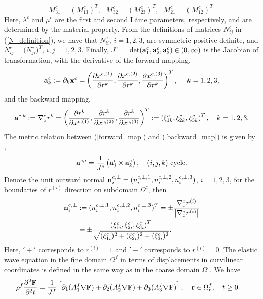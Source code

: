 \[ M_{31}^c = (M_{13}^c)^T, \ \ \  M_{32}^c =(M_{23}^c)^T, \ \ \ M_{21}^c =(M_{12}^c)^T.\]
Here, $\lambda^c$ and $\mu^c$ are the first and second L{\' {a}}me parameters, respectively, and are determined by the material property. From the definitions of matrices $N_{ij}^c$ in (\ref{N_definition}), we have that $N_{ii}^c$, $i = 1,2,3$, are symmetric positive definite, and $N_{ij}^c=\big(N_{ji}^c\big)^T$, $i,j=1,2,3$. Finally, $J^c =$ det$\left({\bf a}^c_1,{\bf a}^c_2,{\bf a}^c_3\right)\in (0,\infty)$ is the Jacobian of transformation, with the derivative of the forward mapping, 
\begin{equation}\label{forward_map}
{\bf a}_k^c := \partial_k{\bf x}^c  = \left(\frac{\partial x^{c,(1)}}{\partial r^{k}},\frac{\partial x^{c,(2)}}{\partial r^{k}},\frac{\partial x^{c,(3)}}{\partial r^{k}}\right)^T,\ \ \ \ k = 1,2,3,
\end{equation}
and the backward mapping,
\begin{equation}\label{backward_map}
{\bf a}^{c,k} := \nabla_x^c r^{k} = \left(\frac{\partial r^{k}}{\partial x^{c,(1)}},\frac{\partial r^{k}}{\partial x^{c,(2)}},\frac{\partial r^{k}}{\partial x^{c,(3)}}\right)^T := \left(\xi_{1k}^c,\xi_{2k}^c,\xi_{3k}^c\right)^T,\ \ \ k = 1,2,3.
\end{equation}
 The metric relation between (\ref{forward_map}) and (\ref{backward_map}) is given by \cite{thompson1985numerical},
\begin{equation*}
{\bf a}^{c,i} = \frac{1}{J^c}\left({\bf a}_j^c\times{\bf a}_k^c\right), \ \ \ (i,j,k) \ \mbox{cycle}.
\end{equation*}
Denote the unit outward normal ${\bf n}_i^{c,\pm} = (n_i^{c,\pm,1},n_i^{c,\pm,2},n_i^{c,\pm,3})$, $i = 1,2,3$, for the boundaries of $r^{(i)}$ direction on subdomain $\Omega^c$, then
\begin{align}\label{outward_normal}
{\bf n}_i^{c,\pm} &:= (n^{c,\pm,1}_i,n^{c,\pm,2}_i,n^{c,\pm,3}_i)^T = \pm \frac{\nabla_x^c r^{(i)}}{\left|\nabla_x^c r^{(i)}\right|} \nonumber\\
&= \pm\frac{ \left(\xi_{1i}^c,\xi_{2i}^c,\xi_{3i}^c\right)^T}{\sqrt{(\xi_{1i}^c)^2+(\xi_{2i}^c)^2+(\xi_{3i}^c)^2}}.
\end{align}
Here, $'+'$ corresponds to $r^{(i)} = 1$ and $'-'$ corresponds to $r^{(i)} = 0$. The elastic wave equation in the fine domain $\Omega^f$ in terms of displacements in curvilinear coordinates is defined in the same way as in the  coarse domain $\Omega^c$. We have 
\begin{align}\label{elastic_curvi_f}
	\rho^f\frac{\partial^2{\bf F}}{\partial^2 t} &= \frac{1}{J^f}\left[\partial_1(A_1^f\nabla{\bf F}) + \partial_2(A_2^f\nabla{\bf F}) +\partial_3(A_3^f\nabla{\bf F}) \right], \ \ \  {\bf r}\in\Omega^f_r,\ \ \  t\geq0.
\end{align}


